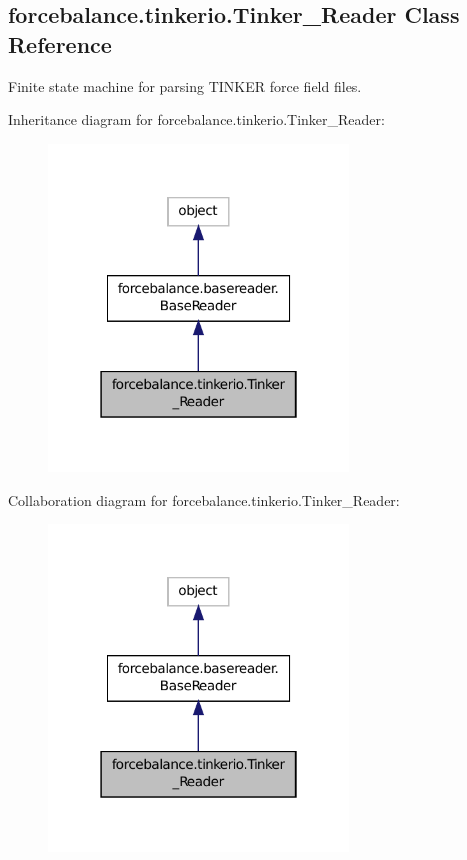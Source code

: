 \hypertarget{classforcebalance_1_1tinkerio_1_1Tinker__Reader}{\subsection{forcebalance.\-tinkerio.\-Tinker\-\_\-\-Reader Class Reference}
\label{classforcebalance_1_1tinkerio_1_1Tinker__Reader}
}


Finite state machine for parsing T\-I\-N\-K\-E\-R force field files.  




Inheritance diagram for forcebalance.\-tinkerio.\-Tinker\-\_\-\-Reader\-:
\nopagebreak
\begin{figure}[H]
\begin{center}
\leavevmode
\includegraphics[width=226pt]{classforcebalance_1_1tinkerio_1_1Tinker__Reader__inherit__graph}
\end{center}
\end{figure}


Collaboration diagram for forcebalance.\-tinkerio.\-Tinker\-\_\-\-Reader\-:
\nopagebreak
\begin{figure}[H]
\begin{center}
\leavevmode
\includegraphics[width=226pt]{classforcebalance_1_1tinkerio_1_1Tinker__Reader__coll__graph}
\end{center}
\end{figure}
